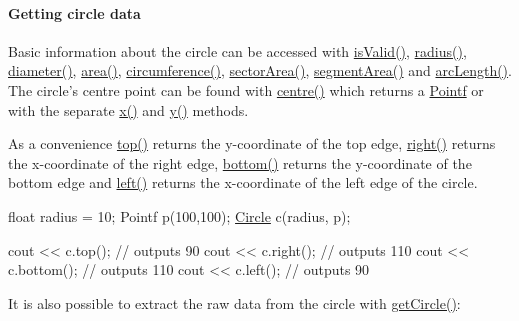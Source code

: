 \paragraph*{Getting circle data}

Basic information about the circle can be accessed with \hyperlink{classprism_1_1_circle_adbc46c944f02c028ec95acd1a9b69c5b}{is\+Valid()}, \hyperlink{classprism_1_1_circle_a75afa2c59f92909d6b6edcec338030fb}{radius()}, \hyperlink{classprism_1_1_circle_a9157a21edb3cf02e2eae06d97fe7dec4}{diameter()}, \hyperlink{classprism_1_1_circle_a2fd1893972ad8b267bebfdc59efafb84}{area()}, \hyperlink{classprism_1_1_circle_ad32df9ed83620dd55e9541af31258899}{circumference()}, \hyperlink{classprism_1_1_circle_a0218baa72b2668f116058928c495cf00}{sector\+Area()}, \hyperlink{classprism_1_1_circle_a454311b6f7a7db3f0cea53971abfdbdc}{segment\+Area()} and \hyperlink{classprism_1_1_circle_a8784d12fcb2c2a2ca679635afba4c15e}{arc\+Length()}. The circle’s centre point can be found with \hyperlink{classprism_1_1_circle_acecd853a1b505fc0c847b7172974d669}{centre()} which returns a \hyperlink{classprism_1_1_pointf}{Pointf} or with the separate \hyperlink{classprism_1_1_circle_ae1f729f8fa34605123628e67b230b6be}{x()} and \hyperlink{classprism_1_1_circle_a6edc045d912b0d278bd0673af028290e}{y()} methods.

As a convenience \hyperlink{classprism_1_1_circle_a2c1851a017d5379d8ddf2a80d7bd1b1b}{top()} returns the y-\/coordinate of the top edge, \hyperlink{classprism_1_1_circle_a3b8cdbb5ad090615534c09543afadf88}{right()} returns the x-\/coordinate of the right edge, \hyperlink{classprism_1_1_circle_a88c4958371f4e07082c3b28527b67d4b}{bottom()} returns the y-\/coordinate of the bottom edge and \hyperlink{classprism_1_1_circle_a8bcb92c5bf29227e2ef5ab0f15b479b2}{left()} returns the x-\/coordinate of the left edge of the circle.


\begin{DoxyCode}
\textcolor{keywordtype}{float} radius = 10;
Pointf p(100,100);
\hyperlink{classprism_1_1_circle_aff41793f64e90d15a4d89851b1a6b011}{Circle} c(radius, p);

cout << c.top(); \textcolor{comment}{// outputs 90}
cout << c.right(); \textcolor{comment}{// outputs 110}
cout << c.bottom(); \textcolor{comment}{// outputs 110}
cout << c.left(); \textcolor{comment}{// outputs 90}
\end{DoxyCode}


It is also possible to extract the raw data from the circle with \hyperlink{classprism_1_1_circle_a84de2ca47dc084e49cc6645e7e723b9d}{get\+Circle()}\+:


